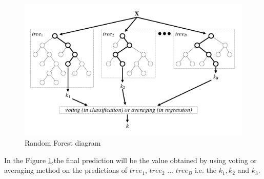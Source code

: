 \begin{figure}[ht]
    \centering
    \includegraphics[width=15cm]{Pictures/random_forest_1.png}
    \caption{Random Forest diagram }
    \label{fig:random_forest}
\end{figure}


In the Figure \ref{fig:random_forest},the final prediction will be the value obtained by using voting or averaging method on the predictions of $tree_1$, $tree_2$ ... $tree_B$ i.e. the $k_1,k_2$ and $k_3$. 